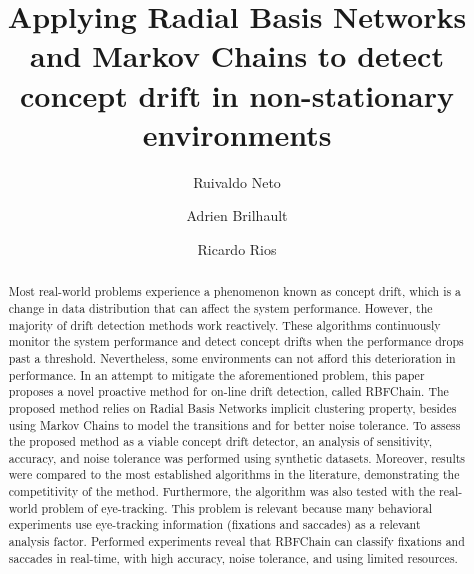 \documentclass[preprint,12pt]{elsarticle}
\begin{document}
\begin{frontmatter}


\title{Applying Radial Basis Networks and Markov Chains to detect concept drift in non-stationary environments}




\author{Ruivaldo Neto}
\author{Adrien Brilhault}
\author{Ricardo Rios}

\address{Salvador, Brazil}

\begin{abstract}
Most real-world problems experience a phenomenon known as concept drift,
which is a change in data distribution that can affect the system performance.
%
However, the majority of drift detection methods work reactively.
These algorithms continuously monitor the system performance
and detect concept drifts when the performance drops past a threshold.
Nevertheless, some environments can not afford this deterioration in performance.
%
In an attempt to mitigate the aforementioned problem,
this paper proposes a novel proactive method for on-line drift detection,
called RBFChain.
The proposed method relies on Radial Basis Networks implicit clustering property,
besides using Markov Chains to model the transitions and for better noise tolerance.
%
To assess the proposed method as a viable concept drift detector,
an analysis of sensitivity, accuracy,
and noise tolerance was performed using synthetic datasets.
Moreover, results were compared to the most established algorithms in the literature,
demonstrating the competitivity of the method.
%
Furthermore, the algorithm was also tested with the real-world problem of eye-tracking.
This problem is relevant because many behavioral experiments use eye-tracking information (fixations and saccades) as a relevant analysis factor.
Performed experiments reveal that RBFChain can classify fixations and saccades in real-time, with high accuracy, noise tolerance, and using limited resources.


\end{abstract}
\end{frontmatter}
\end{document}
